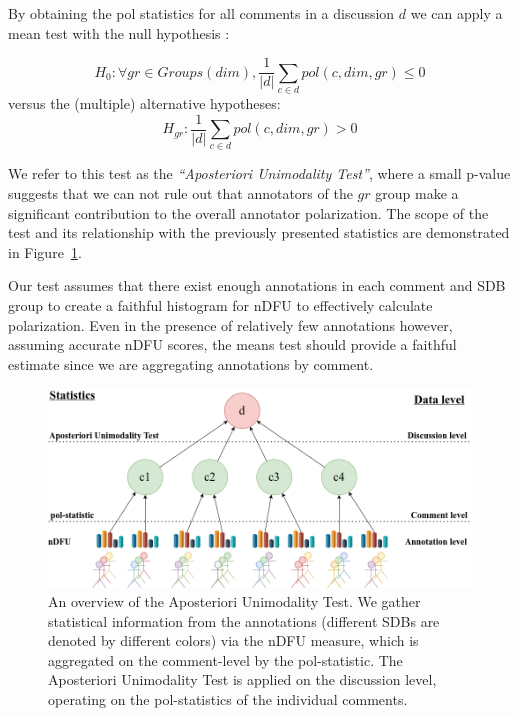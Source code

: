 \documentclass{article}
\newcommand{\sdbdim}{\textit{dim}}
\newcommand{\sdbgroup}{\textit{gr}}
\newcommand{\Sdbgroup}{\textit{Groups}}
\begin{document}
By obtaining the pol statistics for all comments in a discussion $d$ we can apply a mean test with the null hypothesis :

\begin{equation}
	\label{eq:null_h}
	H_0: \forall \sdbgroup \in \Sdbgroup(\sdbdim), \frac{1}{\lvert d \rvert} \sum\limits_{c \in d} pol(c, \sdbdim,  \sdbgroup) \le 0
\end{equation}
\noindent versus the (multiple) alternative hypotheses: 
\begin{equation}
	\label{eq:alt_h}
	H_{\sdbgroup}:\frac{1}{\lvert d \rvert} \sum\limits_{c \in d}  pol(c, \sdbdim, \sdbgroup) >  0
\end{equation}

We refer to this test as the \textit{``Aposteriori Unimodality Test''}, where a small p-value suggests that we can not rule out that annotators of the $\sdbgroup$ group make a significant contribution to the overall annotator polarization. The scope of the test and its relationship with the previously presented statistics are demonstrated in Figure~\ref{fig::overview}.

Our test assumes that there exist enough annotations in each comment and \ac{SDB} group to create a faithful histogram for \ac{nDFU} to effectively calculate polarization. Even in the presence of relatively few annotations however, assuming accurate \ac{nDFU} scores, the means test should provide a faithful estimate since we are aggregating annotations by comment.

\begin{figure}
	\includegraphics[width=\linewidth]{overview.png}
	\caption{An overview of the Aposteriori Unimodality Test. We gather statistical information from the annotations (different \acp{SDB} are denoted by different colors) via the \ac{nDFU} measure, which is aggregated on the comment-level by the pol-statistic. The Aposteriori Unimodality Test is applied on the discussion level, operating on the pol-statistics of the individual comments.}
	\label{fig::overview}
\end{figure}
\end{document}
